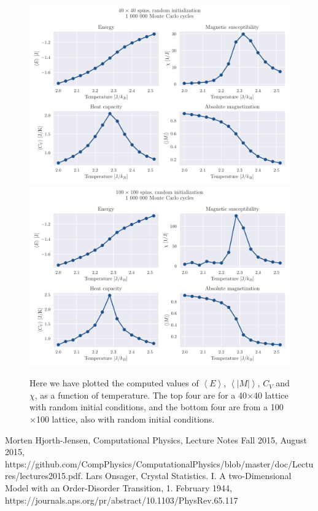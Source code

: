 \documentclass[reprint, english,notitlepage,nofootinbib]{revtex4-1}  %
\begin{document}
\begin{figure}[!htb]
	\includegraphics[width=16cm]{../output/f/L40-T2_0-dT0_04-NT14-N6-RandomTrue-TempExp.pdf}
	\includegraphics[width=16cm]{../output/f/L100-T2_0-dT0_04-NT14-N6-RandomTrue-TempExp.pdf}
	\caption{Here we have plotted the computed values of $\left<E\right>$, $\left<|M|\right>$, $C_V$ and $\chi$, as a function of temperature. The top four are for a 40$\times$40 lattice with random initial conditions, and the bottom four are from a 100$\times$100 lattice, also with random initial conditions.}
	\label{fig:phase_trans}
\end{figure}



\onecolumngrid
\vspace{1cm} %

\begin{thebibliography}{}
 Morten Hjorth-Jensen, Computational Physics, Lecture Notes Fall 2015, August 2015, https://github.com/CompPhysics/ComputationalPhysics/blob/master/doc/Lectures/lectures2015.pdf.
 Lars Onsager, Crystal Statistics. I. A two-Dimensional Model with an Order-Disorder Transition, 1. February 1944, https://journals.aps.org/pr/abstract/10.1103/PhysRev.65.117

\end{thebibliography}
\end{document}

